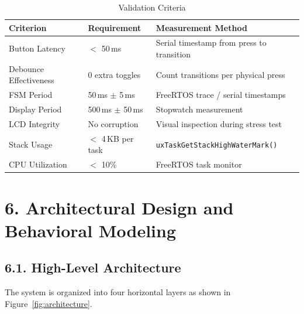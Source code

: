 \documentclass[12pt]{article}
\begin{document}
\begin{table}[H]
    \centering
    \caption{Validation Criteria}
    \label{tab:validation-criteria}
    \begin{tabular}{|l|l|l|}
        \hline
        \textbf{Criterion} & \textbf{Requirement} & \textbf{Measurement Method} \\
        \hline
        Button Latency & $<$ 50\,ms & Serial timestamp from press to transition \\
        \hline
        Debounce Effectiveness & 0 extra toggles & Count transitions per physical press \\
        \hline
        FSM Period & 50\,ms $\pm$ 5\,ms & FreeRTOS trace / serial timestamps \\
        \hline
        Display Period & 500\,ms $\pm$ 50\,ms & Stopwatch measurement \\
        \hline
        LCD Integrity & No corruption & Visual inspection during stress test \\
        \hline
        Stack Usage & $<$ 4\,KB per task & \texttt{uxTaskGetStackHighWaterMark()} \\
        \hline
        CPU Utilization & $<$ 10\% & FreeRTOS task monitor \\
        \hline
    \end{tabular}
\end{table}

\section*{6. Architectural Design and Behavioral Modeling}

\subsection*{6.1. High-Level Architecture}

The system is organized into four horizontal layers as shown in Figure~\ref{fig:architecture}.
\end{document}
